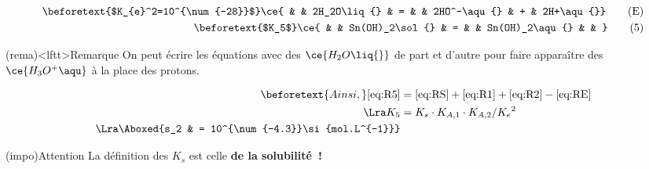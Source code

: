 \documentclass[a4paper, 10pt, final, garamond]{book}
\begin{document}
{\begin{alignat}{4}
		\\
		\beforetext{$K_{e}^2=10^{\num{-28}}$}
		\ce{               &   & 2H_2O\liq{}    & = &  & 2HO^-\aqu{}    & + & 2H+\aqu{}}
		\tag{E}\label{eq:RE}
		\\
		\beforetext{$K_5$}
		\ce{               &   & Sn(OH)_2\sol{} & = &  & Sn(OH)_2\aqu{} &   & }
		\tag{5}\label{eq:R5}
	\end{alignat}
	\begin{tcb}(rema)<lftt>{Remarque}
		On peut écrire les équations avec des $\ce{H_2O\liq{}}$ de part et d'autre
		pour faire apparaître des $\ce{H_3O^+\aqu}$ à la place des protons.
	\end{tcb}
	\begin{align*}
		\beforetext{Ainsi,}
		\eqref*{eq:R5} & = \eqref*{eq:RS} + \eqref*{eq:R1} + \eqref*{eq:R2} - \eqref*{eq:RE}
		\\\Lra
		K_5            & = K_s \cdot K_{A,1} \cdot  K_{A,2} / K_e{}^2
		\\\Lra
		\Aboxed{s_2    & = 10^{\num{-4.3}}\si{mol.L^{-1}}}
	\end{align*}
	\begin{tcb}[center](impo){Attention}
		La définition des $K_s$ est celle \textbf{de la solubilité~!}
	\end{tcb}
}
\end{document}
